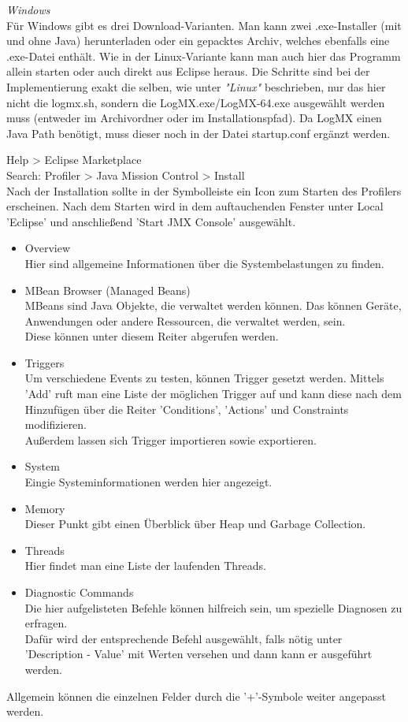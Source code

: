 \emph{Windows}
\\
Für Windows gibt es drei Download-Varianten. Man kann zwei .exe-Installer (mit und ohne Java) herunterladen oder ein gepacktes Archiv, welches ebenfalls eine .exe-Datei enthält. Wie in der Linux-Variante kann man auch hier das Programm allein starten oder auch direkt aus Eclipse heraus. Die Schritte sind bei der Implementierung exakt die selben, wie unter \textit{"Linux"} beschrieben, nur das hier nicht die logmx.sh, sondern die LogMX.exe/LogMX-64.exe ausgewählt werden muss (entweder im Archivordner oder im Installationspfad).
Da LogMX einen Java Path benötigt, muss dieser noch in der Datei startup.conf ergänzt werden.
\nsecend %
\nsecend %

Help > Eclipse Marketplace\\
Search: Profiler > Java Mission Control > Install\\
Nach der Installation sollte in der Symbolleiste ein Icon zum Starten des Profilers erscheinen.
\nsecend
{}
Nach dem Starten wird in dem auftauchenden Fenster unter Local  'Eclipse' und anschließend 'Start JMX Console' ausgewählt.\\
\begin{itemize}
\item Overview\\
Hier sind allgemeine Informationen über die Systembelastungen zu finden.
\item MBean Browser (Managed Beans)\\
MBeans sind Java Objekte, die verwaltet werden können. Das können Geräte, Anwendungen oder andere Ressourcen, die verwaltet werden, sein.\\ Diese können unter diesem Reiter abgerufen werden.
\item Triggers\\
Um verschiedene Events zu testen, können Trigger gesetzt werden. Mittels 'Add' ruft man eine Liste der möglichen Trigger auf und kann diese nach dem Hinzufügen über die Reiter 'Conditions', 'Actions' und Constraints modifizieren.\\
Außerdem lassen sich Trigger importieren sowie exportieren.
\item System\\
Eingie Systeminformationen werden hier angezeigt.
\item Memory\\
Dieser Punkt gibt einen Überblick über Heap und Garbage Collection.
\item Threads\\
Hier findet man eine Liste der laufenden Threads.
\item Diagnostic Commands\\
Die hier aufgelisteten Befehle können hilfreich sein, um spezielle Diagnosen zu erfragen.\\
Dafür wird der entsprechende Befehl ausgewählt, falls nötig unter 'Description - Value' mit Werten versehen und dann kann er ausgeführt werden.
\end{itemize}
Allgemein können die einzelnen Felder durch die '+'-Symbole weiter angepasst werden.
\nsecend
\nsecend %

